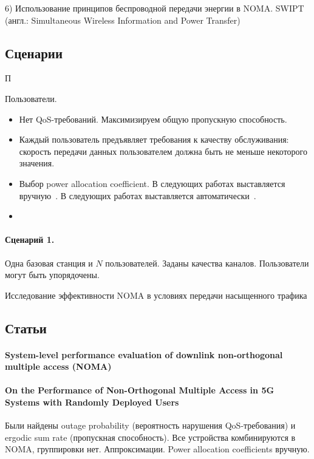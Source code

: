 \documentclass{book}
\numberwithin{theorem}{chapter}
\numberwithin{statement}{chapter}
\numberwithin{lemma}{chapter}
\theoremstyle{definition}
\numberwithin{task}{chapter}
\theoremstyle{remark}
\numberwithin{example}{chapter}
\theoremstyle{definition}
\numberwithin{definition}{chapter}
\theoremstyle{remark}
\theoremstyle{remark}
\numberwithin{lyrics}{section}
\begin{document}
	6) Использование принципов беспроводной передачи энергии в NOMA. SWIPT (англ.: Simultaneous Wireless Information and Power Transfer)
	

\subsection{Сценарии}

П

Пользователи. 
\begin{itemize}
\item Нет QoS-требований. Максимизируем общую пропускную способность.
\item Каждый пользователь предъявляет требования к качеству обслуживания: скорость передачи данных пользователем должна быть не меньше некоторого значения. 
\end{itemize}

\begin{itemize}
	\item Выбор power allocation coefficient. В следующих работах выставляется вручную~\cite{ding2014performance}. В следующих работах выставляется автоматически~\cite{}.
	\item
\end{itemize}

\paragraph{Сценарий 1.} Одна базовая станция и $N$ пользователей. Заданы качества каналов. Пользователи могут быть упорядочены. 

Исследование эффективности NOMA в условиях передачи насыщенного трафика
	
	
\subsection{Статьи}

\paragraph{System-level performance evaluation of downlink non-orthogonal multiple access (NOMA)~\cite{saito2013system}}

\paragraph{On the Performance of Non-Orthogonal Multiple Access in 5G Systems with Randomly Deployed Users~\cite{ding2014performance}}
Были найдены outage probability (вероятность нарушения QoS-требования) и ergodic sum rate (пропускная способность). Все устройства комбинируются в NOMA, группировки нет. Аппроксимации. Power allocation coefficients вручную.
\end{document}
